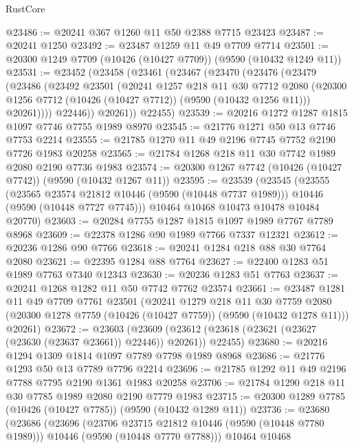 \begin{lexlean}{RustCore}
\begin{coremodule}
@23486 := @20241 @367 @1260 @11 @50 @2388 @7715 @23423
@23487 := @20241 @1250
@23492 := @23487 @1259 @11 @49 @7709 @7714
@23501 := @20300 @1249 @7709 (@10426 (@10427 @7709)) (@9590 (@10432 @1249 @11))
@23531 := @23452
    (@23458
      (@23461
        (@23467
          (@23470
            (@23476
              (@23479
                (@23486
                  (@23492
                    @23501
                    (@20241
                      @1257
                      @218
                      @11
                      @30
                      @7712
                      @2080
                      (@20300 @1256 @7712 (@10426 (@10427 @7712)) (@9590 (@10432 @1256 @11)))
                      @20261))))
              @22446))
          @20261))
      @22455)
@23539 := @20216 @1272 @1287 @1815 @1097 @7746 @7755 @1989 @8970
@23545 := @21776 @1271 @50 @13 @7746 @7753 @2214
@23555 := @21785 @1270 @11 @49 @2196 @7745 @7752 @2190 @7726 @1983 @20258
@23565 := @21784 @1268 @218 @11 @30 @7742 @1989 @2080 @2190 @7736 @1983
@23574 := @20300 @1267 @7742 (@10426 (@10427 @7742)) (@9590 (@10432 @1267 @11))
@23595 := @23539
    (@23545
      (@23555
        (@23565 @23574 @21812 @10446 (@9590 (@10448 @7737 @1989)))
        @10446
        (@9590 (@10448 @7727 @7745)))
      @10464
      @10468
      @10473
      @10478
      @10484
      @20770)
@23603 := @20284 @7755 @1287 @1815 @1097 @1989 @7767 @7789 @8968
@23609 := @22378 @1286 @90 @1989 @7766 @7337 @12321
@23612 := @20236 @1286 @90 @7766
@23618 := @20241 @1284 @218 @88 @30 @7764 @2080
@23621 := @22395 @1284 @88 @7764
@23627 := @22400 @1283 @51 @1989 @7763 @7340 @12343
@23630 := @20236 @1283 @51 @7763
@23637 := @20241 @1268 @1282 @11 @50 @7742 @7762 @23574
@23661 := @23487
    @1281
    @11
    @49
    @7709
    @7761
    @23501
    (@20241
      @1279
      @218
      @11
      @30
      @7759
      @2080
      (@20300 @1278 @7759 (@10426 (@10427 @7759)) (@9590 (@10432 @1278 @11)))
      @20261)
@23672 := @23603
    (@23609 (@23612 (@23618 (@23621 (@23627 (@23630 (@23637 @23661)) @22446)) @20261)) @22455)
@23680 := @20216 @1294 @1309 @1814 @1097 @7789 @7798 @1989 @8968
@23686 := @21776 @1293 @50 @13 @7789 @7796 @2214
@23696 := @21785 @1292 @11 @49 @2196 @7788 @7795 @2190 @1361 @1983 @20258
@23706 := @21784 @1290 @218 @11 @30 @7785 @1989 @2080 @2190 @7779 @1983
@23715 := @20300 @1289 @7785 (@10426 (@10427 @7785)) (@9590 (@10432 @1289 @11))
@23736 := @23680
    (@23686
      (@23696
        (@23706 @23715 @21812 @10446 (@9590 (@10448 @7780 @1989)))
        @10446
        (@9590 (@10448 @7770 @7788)))
      @10464
      @10468

\end{coremodule}
\end{lexlean}
